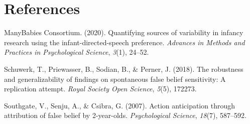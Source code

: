 \documentclass[
  man, donotrepeattitle,floatsintext]{apa6}
\newlength{\cslhangindent}
\newenvironment{CSLReferences}[2] %
 {\begin{list}{}{%
  \setlength{\itemindent}{0pt}
  \setlength{\leftmargin}{0pt}
  \setlength{\parsep}{0pt}
  \ifodd #1
   \setlength{\leftmargin}{\cslhangindent}
   \setlength{\itemindent}{-1\cslhangindent}
  \fi
  \setlength{\itemsep}{#2\baselineskip}}}
 {\end{list}}
\begin{document}
\newpage

\section{References}\label{references}

\begingroup
\setlength{\parindent}{-0.5in}
\setlength{\leftskip}{0.5in}

\label{refs}
\begin{CSLReferences}{1}{0}
ManyBabies Consortium. (2020). Quantifying sources of variability in infancy research using the infant-directed-speech preference. \emph{Advances in Methods and Practices in Psychological Science}, \emph{3}(1), 24--52.

Schuwerk, T., Priewasser, B., Sodian, B., \& Perner, J. (2018). The robustness and generalizability of findings on spontaneous false belief sensitivity: A replication attempt. \emph{Royal Society Open Science}, \emph{5}(5), 172273.

Southgate, V., Senju, A., \& Csibra, G. (2007). Action anticipation through attribution of false belief by 2-year-olds. \emph{Psychological Science}, \emph{18}(7), 587--592.

\end{CSLReferences}

\endgroup
\end{document}

